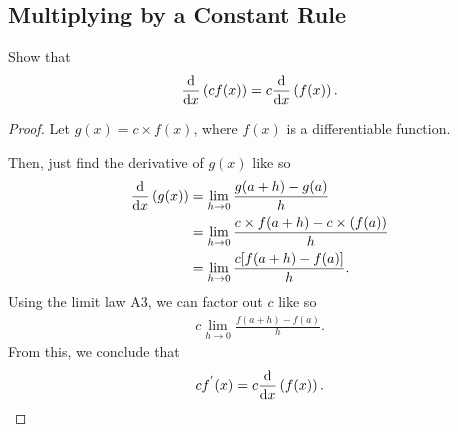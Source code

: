 \subsection{Multiplying by a Constant Rule}

Show that
\[%
  \odv{}{x}\left(cf(x)\right) = c\odv{}{x}\left(f(x)\right)
.\]%

\begin{proof}
  Let $g(x) = c \times f(x)$, where $f(x)$ is a differentiable function.

  Then, just find the derivative of $g(x)$ like so
  \begin{align*}
    \odv{}{x}\left(g(x)\right) &= \lim_{h \to 0} \frac{g(a+h) - g(a)}{h} \\
                               &= \lim_{h \to 0} \frac{c \times f(a+h) - c \times (f(a))}{h} \\
                               &= \lim_{h \to 0} \frac{c[f(a+h) - f(a)]}{h}
  .\end{align*}
  Using the limit law A3, we can factor out $c$ like so
  \begin{align*}
    c\lim_{h \to 0} \frac{f(a+h) - f(a)}{h}
  .\end{align*}
  From this, we conclude that
  \[%
    cf^{'}(x) = c\odv{}{x}\left(f(x)\right)
  .\]%
\end{proof}
